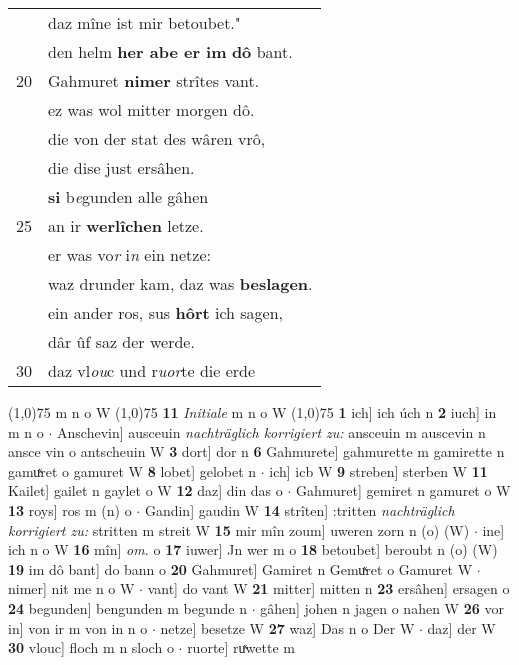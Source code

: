 \documentclass[8pt,a4paper,notitlepage]{article}
\begin{document}
\begin{table}[ht]
\begin{minipage}[t]{0.5\linewidth}
\begin{tabular}{rl}
 & daz mîne ist mir betoubet."\\ 
 & den helm \textbf{her abe er im} \textbf{dô} bant.\\ 
20 & Gahmuret \textbf{nimer} strîtes vant.\\ 
 & ez was wol mitter morgen dô.\\ 
 & die von der stat des wâren vrô,\\ 
 & die dise just ersâhen.\\ 
 & \textbf{si} b\textit{e}gunden alle gâhen\\ 
25 & an ir \textbf{werlîchen} letze.\\ 
 & er was vo\textit{r} i\textit{n} ein netze:\\ 
 & waz drunder kam, daz was \textbf{beslagen}.\\ 
 & ein ander ros, sus \textbf{hôrt} ich sagen,\\ 
 & dâr ûf saz der werde.\\ 
30 & daz vl\textit{ou}c und r\textit{uor}te die erde\\ 
\end{tabular}
\scriptsize
\line(1,0){75} \newline
m n o W \newline
\line(1,0){75} \newline
\textbf{11} \textit{Initiale} m n o W  \newline
\line(1,0){75} \newline
\textbf{1} ich] ich úch n \textbf{2} iuch] in m n o  $\cdot$ Anschevin] ausceuin \textit{nachträglich korrigiert zu:} ansceuin m auscevin n ansce vin o antscheuin W \textbf{3} dort] dor n \textbf{6} Gahmurete] gahmurette m gamirette n gamuͯret o gamuret W \textbf{8} lobet] gelobet n  $\cdot$ ich] icb W \textbf{9} streben] sterben W \textbf{11} Kailet] gailet n gaylet o W \textbf{12} daz] din das o  $\cdot$ Gahmuret] gemiret n gamuret o W \textbf{13} roys] ros m (n) o  $\cdot$ Gandin] gaudin W \textbf{14} strîten] :tritten \textit{nachträglich korrigiert zu:} stritten m streit W \textbf{15} mir mîn zoum] uweren zorn n (o) (W)  $\cdot$ ine] ich n o W \textbf{16} mîn] \textit{om.} o \textbf{17} iuwer] Jn wer m o \textbf{18} betoubet] beroubt n (o) (W) \textbf{19} im dô bant] do bann o \textbf{20} Gahmuret] Gamiret n Gemuͯret o Gamuret W  $\cdot$ nimer] nit me n o W  $\cdot$ vant] do vant W \textbf{21} mitter] mitten n \textbf{23} ersâhen] ersagen o \textbf{24} begunden] bengunden m begunde n  $\cdot$ gâhen] johen n jagen o nahen W \textbf{26} vor in] von ir m von in n o  $\cdot$ netze] besetze W \textbf{27} waz] Das n o Der W  $\cdot$ daz] der W \textbf{30} vlouc] floch m n sloch o  $\cdot$ ruorte] ruͯwette m \newline
\end{minipage}
\end{table}
\end{document}
